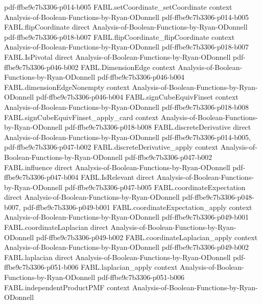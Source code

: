 \begin{theorem}
  {pdf-ffbe9c7b3306-p014-b005}
\proofstep
  {FABL.setCoordinate_setCoordinate}
  {context}
  {Analysis-of-Boolean-Functions-by-Ryan-ODonnell}
  {pdf-ffbe9c7b3306-p014-b005}
\proofstep
  {FABL.flipCoordinate}
  {direct}
  {Analysis-of-Boolean-Functions-by-Ryan-ODonnell}
  {pdf-ffbe9c7b3306-p018-b007}
\proofstep
  {FABL.flipCoordinate_flipCoordinate}
  {context}
  {Analysis-of-Boolean-Functions-by-Ryan-ODonnell}
  {pdf-ffbe9c7b3306-p018-b007}
\proofstep
  {FABL.IsPivotal}
  {direct}
  {Analysis-of-Boolean-Functions-by-Ryan-ODonnell}
  {pdf-ffbe9c7b3306-p046-b002}
\proofstep
  {FABL.DimensionEdge}
  {context}
  {Analysis-of-Boolean-Functions-by-Ryan-ODonnell}
  {pdf-ffbe9c7b3306-p046-b004}
\proofstep
  {FABL.dimensionEdgeNonempty}
  {context}
  {Analysis-of-Boolean-Functions-by-Ryan-ODonnell}
  {pdf-ffbe9c7b3306-p046-b004}
\proofstep
  {FABL.signCubeEquivFinset}
  {context}
  {Analysis-of-Boolean-Functions-by-Ryan-ODonnell}
  {pdf-ffbe9c7b3306-p018-b008}
\proofstep
  {FABL.signCubeEquivFinset_apply_card}
  {context}
  {Analysis-of-Boolean-Functions-by-Ryan-ODonnell}
  {pdf-ffbe9c7b3306-p018-b008}
\proofstep
  {FABL.discreteDerivative}
  {direct}
  {Analysis-of-Boolean-Functions-by-Ryan-ODonnell}
  {pdf-ffbe9c7b3306-p014-b005,
    pdf-ffbe9c7b3306-p047-b002}
\proofstep
  {FABL.discreteDerivative_apply}
  {context}
  {Analysis-of-Boolean-Functions-by-Ryan-ODonnell}
  {pdf-ffbe9c7b3306-p047-b002}
\proofstep
  {FABL.influence}
  {direct}
  {Analysis-of-Boolean-Functions-by-Ryan-ODonnell}
  {pdf-ffbe9c7b3306-p047-b004}
\proofstep
  {FABL.IsRelevant}
  {direct}
  {Analysis-of-Boolean-Functions-by-Ryan-ODonnell}
  {pdf-ffbe9c7b3306-p047-b005}
\proofstep
  {FABL.coordinateExpectation}
  {direct}
  {Analysis-of-Boolean-Functions-by-Ryan-ODonnell}
  {pdf-ffbe9c7b3306-p048-b007,
    pdf-ffbe9c7b3306-p049-b001}
\proofstep
  {FABL.coordinateExpectation_apply}
  {context}
  {Analysis-of-Boolean-Functions-by-Ryan-ODonnell}
  {pdf-ffbe9c7b3306-p049-b001}
\proofstep
  {FABL.coordinateLaplacian}
  {direct}
  {Analysis-of-Boolean-Functions-by-Ryan-ODonnell}
  {pdf-ffbe9c7b3306-p049-b002}
\proofstep
  {FABL.coordinateLaplacian_apply}
  {context}
  {Analysis-of-Boolean-Functions-by-Ryan-ODonnell}
  {pdf-ffbe9c7b3306-p049-b002}
\proofstep
  {FABL.laplacian}
  {direct}
  {Analysis-of-Boolean-Functions-by-Ryan-ODonnell}
  {pdf-ffbe9c7b3306-p051-b006}
\proofstep
  {FABL.laplacian_apply}
  {context}
  {Analysis-of-Boolean-Functions-by-Ryan-ODonnell}
  {pdf-ffbe9c7b3306-p051-b006}
\proofstep
  {FABL.independentProductPMF}
  {context}
  {Analysis-of-Boolean-Functions-by-Ryan-ODonnell}

\end{theorem}
